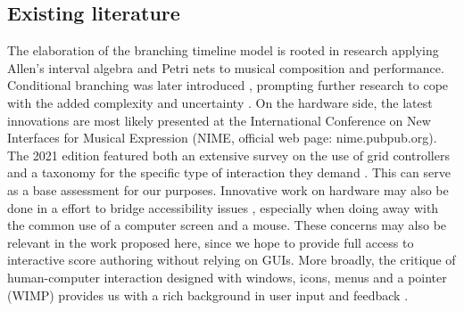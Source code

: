 \documentclass[journal,onecolumn]{IEEEtran}
\begin{document}


\subsection{Existing literature}
The elaboration of the branching timeline model is rooted in research applying Allen's interval algebra \cite{allombert:constraint} and Petri nets \cite{allombert:petri} to musical composition and performance. Conditional branching was later introduced \cite{toro:condition}, prompting further research to cope with the added complexity and uncertainty \cite{arias:colour}. 
On the hardware side, the latest innovations are most likely presented at the International Conference on New Interfaces for Musical Expression (NIME, official web page: nime.pubpub.org). The 2021 edition featured both an extensive survey on the use of grid controllers \cite{rossmy:grid} and a taxonomy for the specific type of interaction they demand \cite{pust:taxonomy}. This can serve as a base assessment for our purposes. 
Innovative work on hardware may also be done in a effort to bridge accessibility issues \cite{forester:loopblocks}\cite{vetter:tangible}, especially when doing away with the common use of a computer screen and a mouse. These concerns may also be relevant in the work proposed here, since we hope to provide full access to interactive score authoring without relying on GUIs. 
More broadly, the critique of human-computer interaction designed with windows, icons, menus and a pointer (WIMP) provides us with a rich background in user input and feedback \cite{baudouin:instrumental}\cite{beaudouin:interaction}. 
\end{document}
